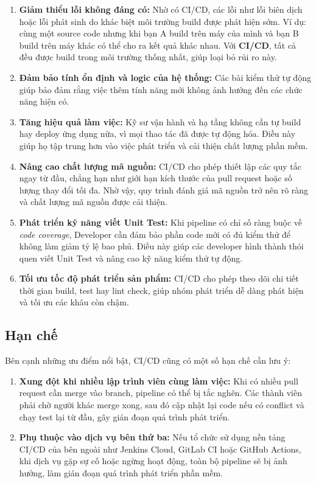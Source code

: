 \begin{enumerate}
	\item \textbf{Giảm thiểu lỗi không đáng có:}  
	Nhờ có CI/CD, các lỗi như lỗi biên dịch hoặc lỗi phát sinh do khác biệt môi trường build được phát hiện sớm.  
	Ví dụ: cùng một source code nhưng khi bạn A build trên máy của mình và bạn B build trên máy khác có thể cho ra kết quả khác nhau.  
	Với \textbf{CI/CD}, tất cả đều được build trong môi trường thống nhất, giúp loại bỏ rủi ro này.
	
	\item \textbf{Đảm bảo tính ổn định và logic của hệ thống:}  
	Các bài kiểm thử tự động giúp bảo đảm rằng việc thêm tính năng mới không ảnh hưởng đến các chức năng hiện có.
	
	\item \textbf{Tăng hiệu quả làm việc:}  
	Kỹ sư vận hành và hạ tầng không cần tự build hay deploy ứng dụng nữa, vì mọi thao tác đã được tự động hóa.  
	Điều này giúp họ tập trung hơn vào việc phát triển và cải thiện chất lượng phần mềm.
	
	\item \textbf{Nâng cao chất lượng mã nguồn:}  
	CI/CD cho phép thiết lập các quy tắc ngay từ đầu, chẳng hạn như giới hạn kích thước của pull request hoặc số lượng thay đổi tối đa.  
	Nhờ vậy, quy trình đánh giá mã nguồn trở nên rõ ràng và chất lượng mã nguồn được cải thiện.
	
	\item \textbf{Phát triển kỹ năng viết Unit Test:}  
	Khi pipeline có chỉ số ràng buộc về \textit{code coverage}, Developer cần đảm bảo phần code mới có đủ kiểm thử để không làm giảm tỷ lệ bao phủ.  
	Điều này giúp các developer hình thành thói quen viết Unit Test và nâng cao kỹ năng kiểm thử tự động.
	
	\item \textbf{Tối ưu tốc độ phát triển sản phẩm:}  
	CI/CD cho phép theo dõi chi tiết thời gian build, test hay lint check, giúp nhóm phát triển dễ dàng phát hiện và tối ưu các khâu còn chậm.
\end{enumerate}

\subsection*{Hạn chế}

Bên cạnh những ưu điểm nổi bật, CI/CD cũng có một số hạn chế cần lưu ý:

\begin{enumerate}
	\item \textbf{Xung đột khi nhiều lập trình viên cùng làm việc:}  
	Khi có nhiều pull request cần merge vào branch, pipeline có thể bị tắc nghẽn.  
	Các thành viên phải chờ người khác merge xong, sau đó cập nhật lại code nếu có conflict và chạy test lại từ đầu, gây gián đoạn quá trình phát triển.
	
	\item \textbf{Phụ thuộc vào dịch vụ bên thứ ba:}  
	Nếu tổ chức sử dụng nền tảng CI/CD của bên ngoài như Jenkins Cloud, GitLab CI hoặc GitHub Actions,  
	khi dịch vụ gặp sự cố hoặc ngừng hoạt động, toàn bộ pipeline sẽ bị ảnh hưởng, làm gián đoạn quá trình phát triển phần mềm.
\end{enumerate}



